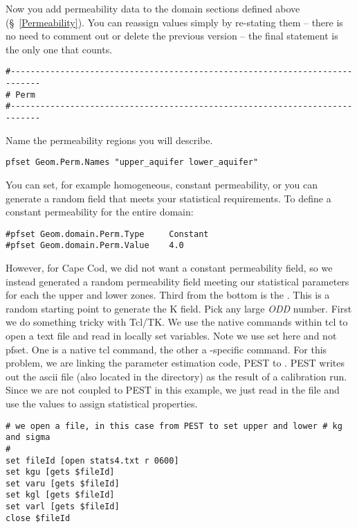 Now you add permeability data to the domain sections defined above (\S~\ref{Permeability}).  
You can reassign values simply by re-stating them -- there is no need to comment out or 
delete the previous version -- the final statement is the only one that counts.

\begin{verbatim}
#----------------------------------------------------------------------------
# Perm
#----------------------------------------------------------------------------
\end{verbatim}

Name the permeability regions you will describe.

\begin{verbatim}
pfset Geom.Perm.Names "upper_aquifer lower_aquifer"
\end{verbatim}

You can set, for example homogeneous, constant permeability, or you can generate a random 
field that meets your statistical requirements.  To define a constant permeability for the entire domain:

\begin{verbatim}
#pfset Geom.domain.Perm.Type     Constant
#pfset Geom.domain.Perm.Value    4.0
\end{verbatim}

However, for Cape Cod, we did not want a constant permeability field, so we instead generated a 
random permeability field meeting our statistical parameters for each the upper and lower zones.  
Third from the bottom is the .  This is a random starting point to generate the K field.  
Pick any large {\em ODD} number.  First we do something tricky with { \file Tcl/TK}. 
We use the native commands within tcl to open a text file and read in locally set variables. 
Note we use set here and not pfset.  One is a native tcl command, the other a \parflow{}-specific command.  
For this problem, we are linking the parameter estimation code, PEST to \parflow{}. 
PEST writes out the ascii file  (also located in the  directory) 
as the result of a calibration run.  Since we are not coupled to PEST in this example, 
we just read in the file and use the values to assign statistical properties.

\begin{verbatim}
# we open a file, in this case from PEST to set upper and lower # kg and sigma
#
set fileId [open stats4.txt r 0600]
set kgu [gets $fileId]
set varu [gets $fileId]
set kgl [gets $fileId]
set varl [gets $fileId]
close $fileId
\end{verbatim}

